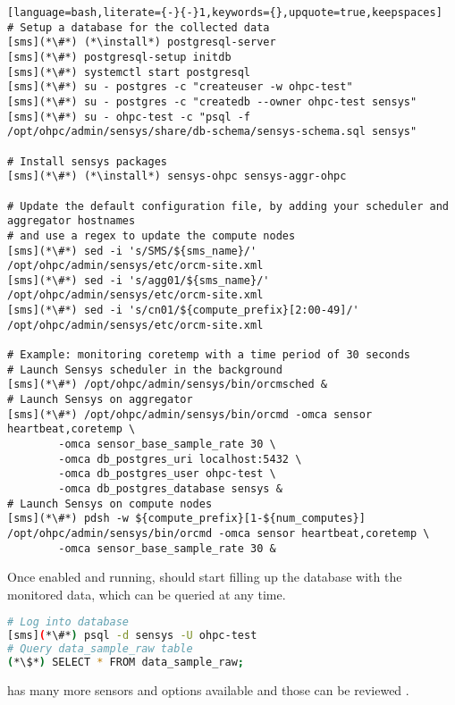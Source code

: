 \begin{lstlisting}[language=bash,literate={-}{-}1,keywords={},upquote=true,keepspaces]
# Setup a database for the collected data
[sms](*\#*) (*\install*) postgresql-server
[sms](*\#*) postgresql-setup initdb
[sms](*\#*) systemctl start postgresql
[sms](*\#*) su - postgres -c "createuser -w ohpc-test"
[sms](*\#*) su - postgres -c "createdb --owner ohpc-test sensys"
[sms](*\#*) su - ohpc-test -c "psql -f /opt/ohpc/admin/sensys/share/db-schema/sensys-schema.sql sensys"

# Install sensys packages
[sms](*\#*) (*\install*) sensys-ohpc sensys-aggr-ohpc

# Update the default configuration file, by adding your scheduler and aggregator hostnames
# and use a regex to update the compute nodes
[sms](*\#*) sed -i 's/SMS/${sms_name}/' /opt/ohpc/admin/sensys/etc/orcm-site.xml
[sms](*\#*) sed -i 's/agg01/${sms_name}/' /opt/ohpc/admin/sensys/etc/orcm-site.xml
[sms](*\#*) sed -i 's/cn01/${compute_prefix}[2:00-49]/' /opt/ohpc/admin/sensys/etc/orcm-site.xml

# Example: monitoring coretemp with a time period of 30 seconds
# Launch Sensys scheduler in the background
[sms](*\#*) /opt/ohpc/admin/sensys/bin/orcmsched &
# Launch Sensys on aggregator
[sms](*\#*) /opt/ohpc/admin/sensys/bin/orcmd -omca sensor heartbeat,coretemp \
        -omca sensor_base_sample_rate 30 \
        -omca db_postgres_uri localhost:5432 \
        -omca db_postgres_user ohpc-test \
        -omca db_postgres_database sensys &
# Launch Sensys on compute nodes
[sms](*\#*) pdsh -w ${compute_prefix}[1-${num_computes}] /opt/ohpc/admin/sensys/bin/orcmd -omca sensor heartbeat,coretemp \
        -omca sensor_base_sample_rate 30 &
\end{lstlisting}

\noindent  Once enabled and running, \Sensys{} should start filling up the
database with the monitored data, which can be queried at any time.

\begin{lstlisting}[language=bash,keywords={},upquote=true]
# Log into database
[sms](*\#*) psql -d sensys -U ohpc-test
# Query data_sample_raw table
(*\$*) SELECT * FROM data_sample_raw;
\end{lstlisting}

\noindent \Sensys{} has many more sensors and options available and those can be
reviewed \href{https://intel-ctrlsys.github.io/sensys}{\color{blue}{here}}.
